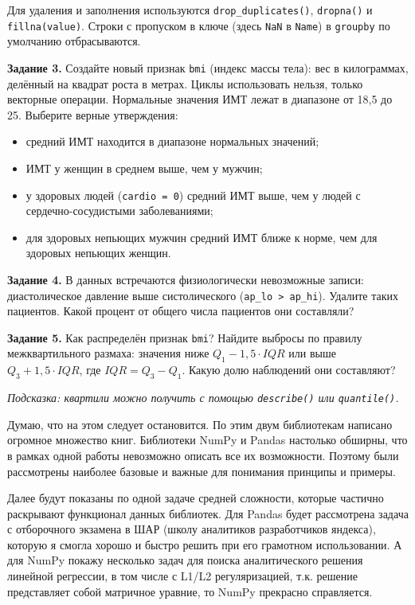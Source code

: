 \documentclass[pract]{SCWorks}
\begin{document}
Для удаления и заполнения используются \texttt{drop\_duplicates()}, \texttt{dropna()} и
\texttt{fillna(value)}. Строки с пропуском в ключе (здесь \texttt{NaN} в \texttt{Name}) в \texttt{groupby}
по умолчанию отбрасываются.

\medskip
\noindent\textbf{Задание 3.} Создайте новый признак \texttt{bmi} (индекс массы тела): вес в килограммах,
делённый на квадрат роста в метрах. Циклы использовать нельзя, только векторные операции. Нормальные значения
ИМТ лежат в диапазоне от 18,5 до 25. Выберите верные утверждения:
\begin{itemize}
    \item[(a)] средний ИМТ находится в диапазоне нормальных значений;
    \item[(b)] ИМТ у женщин в среднем выше, чем у мужчин;
    \item[(c)] у здоровых людей (\texttt{cardio = 0}) средний ИМТ выше, чем у людей с сердечно-сосудистыми
    заболеваниями;
    \item[(d)] для здоровых непьющих мужчин средний ИМТ ближе к норме, чем для здоровых непьющих женщин.
\end{itemize}

\medskip
\noindent\textbf{Задание 4.} В данных встречаются физиологически невозможные записи: диастолическое давление
выше систолического (\texttt{ap\_lo > ap\_hi}). Удалите таких пациентов. Какой процент от общего числа
пациентов они составляли?

\medskip
\noindent\textbf{Задание 5.} Как распределён признак \texttt{bmi}? Найдите выбросы по правилу межквартильного
размаха: значения ниже $Q_1 - 1{,}5\cdot IQR$ или выше $Q_3 + 1{,}5\cdot IQR$, где $IQR = Q_3 - Q_1$. Какую долю
наблюдений они составляют?

\textit{Подсказка: квартили можно получить с помощью \texttt{describe()} или \texttt{quantile()}.}

Думаю, что на этом следует остановится. По этим двум библиотекам написано огромное множество книг.
Библиотеки NumPy и Pandas настолько обширны, что в рамках одной работы невозможно описать все их возможности. 
Поэтому были рассмотрены наиболее базовые и важные для понимания принципы и примеры. 

Далее будут показаны по одной задаче средней сложности, которые частично раскрывают функционал данных 
библиотек. Для Pandas будет рассмотрена задача с отборочного экзамена в ШАР (школу аналитиков разработчиков яндекса), 
которую я смогла хорошо и быстро решить при его грамотном использовании. А для NumPy покажу несколько 
задач для поиска аналитического решения линейной регрессии, в том числе с L1/L2 регуляризацией, т.к. 
решение представляет собой матричное уравние, то NumPy прекрасно справляется.
\end{document}
